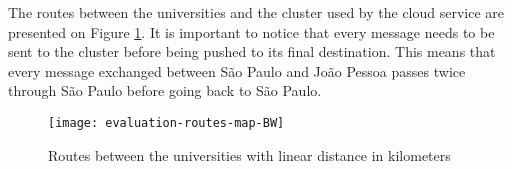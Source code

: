 The routes between the universities and the cluster used by the cloud service are presented on Figure \ref{fig:routes}.
It is important to notice that every message needs to be sent to the cluster before being pushed to its final destination.
This means that every message exchanged between S\~{a}o Paulo and Jo\~{a}o Pessoa passes twice through  S\~{a}o Paulo before going back to S\~{a}o Paulo.


\begin{figure}[!ht]
\centering
\texttt{[image: evaluation-routes-map-BW]}
\caption{Routes between the universities with linear distance in kilometers}
\label{fig:routes}
\end{figure}



